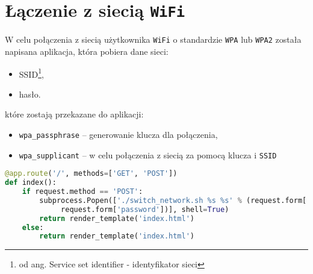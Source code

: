 \section{Łączenie z siecią \texttt{WiFi}}
W celu połączenia z siecią użytkownika \texttt{WiFi} o standardzie 
\texttt{WPA} lub \texttt{WPA2} została napisana aplikacja,
która pobiera dane sieci:
\begin{itemize}
  \item SSID\footnote{od ang. Service set identifier - identyfikator sieci},
  \item hasło.
\end{itemize}
które zostają przekazane do aplikacji:
\begin{itemize}
  \item \texttt{wpa\_passphrase} -- generowanie klucza dla połączenia,
  \item \texttt{wpa\_supplicant} -- w celu połączenia z siecią za pomocą
    klucza i \texttt{SSID}
\end{itemize}
\begin{lstlisting}[frame=single, basicstyle=\ttfamily\small, language=python,
caption={Pobieranie danych z form za pomocą metody \texttt{POST}}]
@app.route('/', methods=['GET', 'POST'])
def index():
    if request.method == 'POST':
        subprocess.Popen(['./switch_network.sh %s %s' % (request.form['ssid'],
			 request.form['password'])], shell=True)
        return render_template('index.html')
    else:
        return render_template('index.html')
\end{lstlisting}



